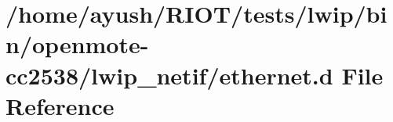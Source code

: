 \hypertarget{openmote-cc2538_2lwip__netif_2ethernet_8d}{}\section{/home/ayush/\+R\+I\+O\+T/tests/lwip/bin/openmote-\/cc2538/lwip\+\_\+netif/ethernet.d File Reference}
\label{openmote-cc2538_2lwip__netif_2ethernet_8d}

